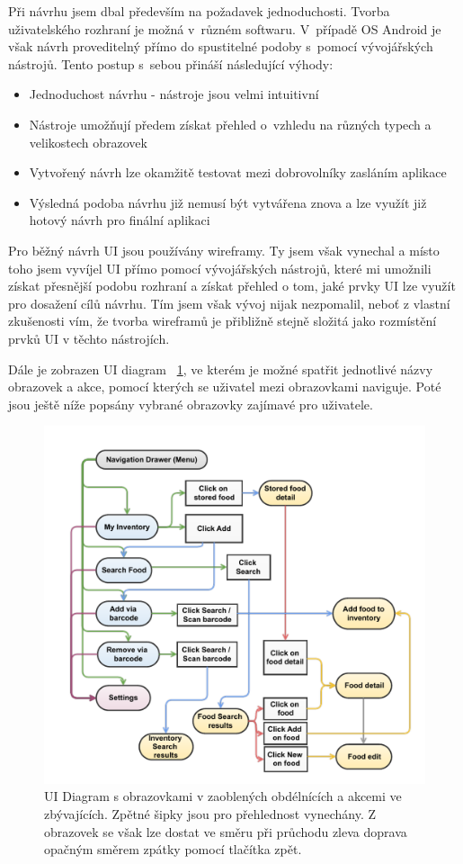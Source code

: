 \documentclass[thesis=B,czech]{FITthesis}[2013/10/20]
\begin{document}
Při návrhu jsem dbal především na požadavek jednoduchosti. Tvorba uživatelského rozhraní je možná v~různém softwaru. V~případě OS Android je však návrh proveditelný přímo do spustitelné podoby s~pomocí vývojářských nástrojů. Tento postup s~sebou přináší následující výhody:

\begin{itemize}
  \item{Jednoduchost návrhu - nástroje jsou velmi intuitivní}
  \item{Nástroje umožňují předem získat přehled o~vzhledu na různých typech a velikostech obrazovek}
  \item{Vytvořený návrh lze okamžitě testovat mezi dobrovolníky zasláním aplikace}
  \item{Výsledná podoba návrhu již nemusí být vytvářena znova a lze využít již hotový návrh pro finální aplikaci}
\end{itemize}

Pro běžný návrh UI jsou používány wireframy. Ty jsem však vynechal a místo toho jsem vyvíjel UI přímo pomocí vývojářských nástrojů, které mi umožnili získat přesnější podobu rozhraní a získat přehled o tom, jaké prvky UI lze využít pro dosažení cílů návrhu. Tím jsem však vývoj nijak nezpomalil, neboť z vlastní zkušenosti vím, že tvorba wireframů je přibližně stejně složitá jako rozmístění prvků UI v těchto nástrojích.

Dále je zobrazen UI diagram ~\ref{fig:UIDiagram}, ve kterém je možné spatřit jednotlivé názvy obrazovek a akce, pomocí kterých se uživatel mezi obrazovkami naviguje. Poté jsou ještě níže popsány vybrané obrazovky zajímavé pro uživatele.

\begin{figure}[H]
  \centering
  \includegraphics[scale=0.70]{diagrams/ui.pdf}
  \caption{UI Diagram s obrazovkami v zaoblených obdélnících a akcemi ve zbývajících. Zpětné šipky jsou pro přehlednost vynechány. Z obrazovek se však lze dostat ve směru při průchodu zleva doprava opačným směrem zpátky pomocí tlačítka zpět.}
  \label{fig:UIDiagram}
\end{figure}
\end{document}
